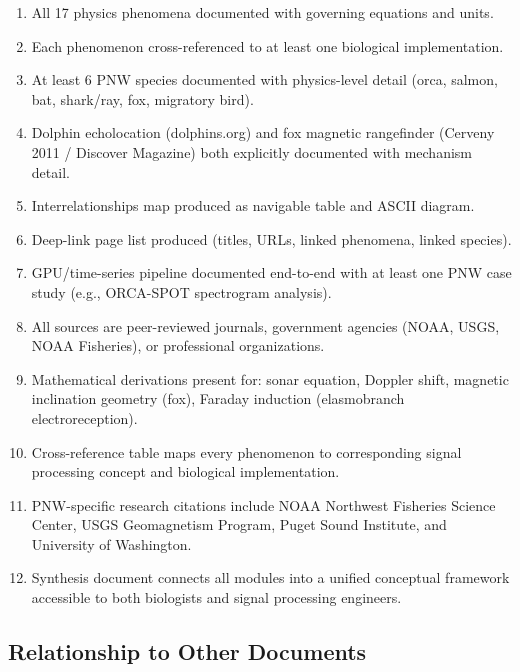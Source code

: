 \documentclass[11pt,letterpaper]{article}
\begin{document}
\begin{enumerate}
  \item All 17 physics phenomena documented with governing equations and units.
  \item Each phenomenon cross-referenced to at least one biological implementation.
  \item At least 6 PNW species documented with physics-level detail (orca, salmon, bat, shark/ray, fox, migratory bird).
  \item Dolphin echolocation (dolphins.org) and fox magnetic rangefinder (Cerveny 2011 / Discover Magazine) both explicitly documented with mechanism detail.
  \item Interrelationships map produced as navigable table and ASCII diagram.
  \item Deep-link page list produced (titles, URLs, linked phenomena, linked species).
  \item GPU/time-series pipeline documented end-to-end with at least one PNW case study (e.g., ORCA-SPOT spectrogram analysis).
  \item All sources are peer-reviewed journals, government agencies (NOAA, USGS, NOAA Fisheries), or professional organizations.
  \item Mathematical derivations present for: sonar equation, Doppler shift, magnetic inclination geometry (fox), Faraday induction (elasmobranch electroreception).
  \item Cross-reference table maps every phenomenon to corresponding signal processing concept and biological implementation.
  \item PNW-specific research citations include NOAA Northwest Fisheries Science Center, USGS Geomagnetism Program, Puget Sound Institute, and University of Washington.
  \item Synthesis document connects all modules into a unified conceptual framework accessible to both biologists and signal processing engineers.
\end{enumerate}

\subsection{Relationship to Other Documents}
\end{document}
